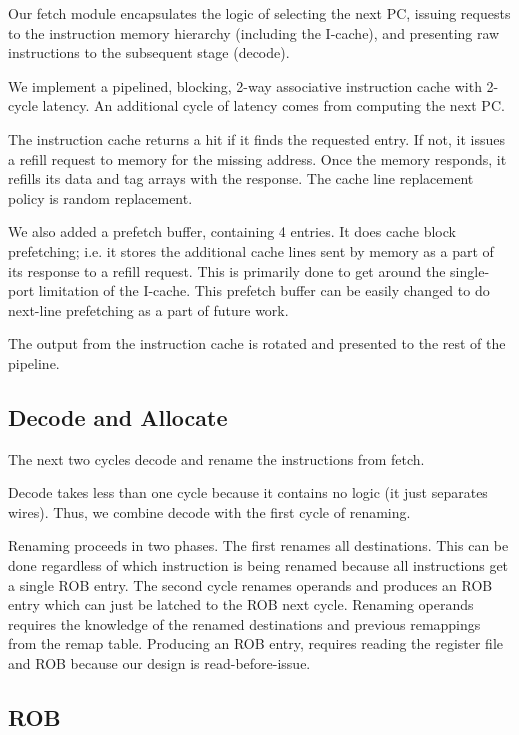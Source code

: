 \documentclass{article}
\begin{document}
Our fetch module encapsulates the logic of selecting the next PC, issuing
requests to the instruction memory hierarchy (including the I-cache), and
presenting raw instructions to the subsequent stage (decode).

We implement a pipelined, blocking, 2-way associative instruction cache with
2-cycle latency. An additional cycle of latency comes from computing the next
PC.

The instruction cache returns a hit if it finds the requested entry. If not, it
issues a refill request to memory for the missing address. Once the memory
responds, it refills its data and tag arrays with the response. The cache line
replacement policy is random replacement.

We also added a prefetch buffer, containing 4 entries. It does cache block
prefetching; i.e. it stores the additional cache lines sent by memory as a part
of its response to a refill request. This is primarily done to get around the
single-port limitation of the I-cache. This prefetch buffer can be easily
changed to do next-line prefetching as a part of future work.

The output from the instruction cache is rotated and presented to the rest of
the pipeline.

\subsection{Decode and Allocate}

The next two cycles decode and rename the instructions from fetch.

Decode takes less than one cycle because it contains no logic (it just separates
wires). Thus, we combine decode with the first cycle of renaming.

Renaming proceeds in two phases. The first renames all destinations. This can be
done regardless of which instruction is being renamed because all instructions
get a single ROB entry. The second cycle renames operands and produces an ROB
entry which can just be latched to the ROB next cycle. Renaming operands
requires the knowledge of the renamed destinations and previous remappings from
the remap table. Producing an ROB entry, requires reading the register file and
ROB because our design is read-before-issue.

\subsection{ROB}
\end{document}
